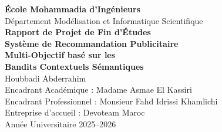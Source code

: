\documentclass[12pt, a4paper, oneside]{report}
\begin{document}
\begin{titlepage}
    \centering
    \vspace*{2cm}
    {\Large \textbf{École Mohammadia d'Ingénieurs}}\\[0.5cm]
    {\large Département Modélisation et Informatique Scientifique}\\[2cm]
    {\LARGE \textbf{Rapport de Projet de Fin d'Études}}\\[1cm]
    {\huge \textbf{Système de Recommandation Publicitaire\\Multi-Objectif basé sur les\\Bandits Contextuels Sémantiques}}\\[2cm]
    {\Large Houbbadi Abderrahim}\\[1cm]
    {\large Encadrant Académique : Madame Asmae El Kassiri}\\[0.3cm]
    {\large Encadrant Professionnel : Monsieur Fahd Idrissi Khamlichi}\\[0.3cm]
    {\large Entreprise d'accueil : Devoteam Maroc}\\[2cm]
    {\large Année Universitaire 2025--2026}
\end{titlepage}

\tableofcontents
\clearpage


\clearpage


\clearpage


\clearpage


\clearpage


\clearpage

\printbibliography[heading=bibintoc, title={Références Bibliographiques}]
\end{document}
